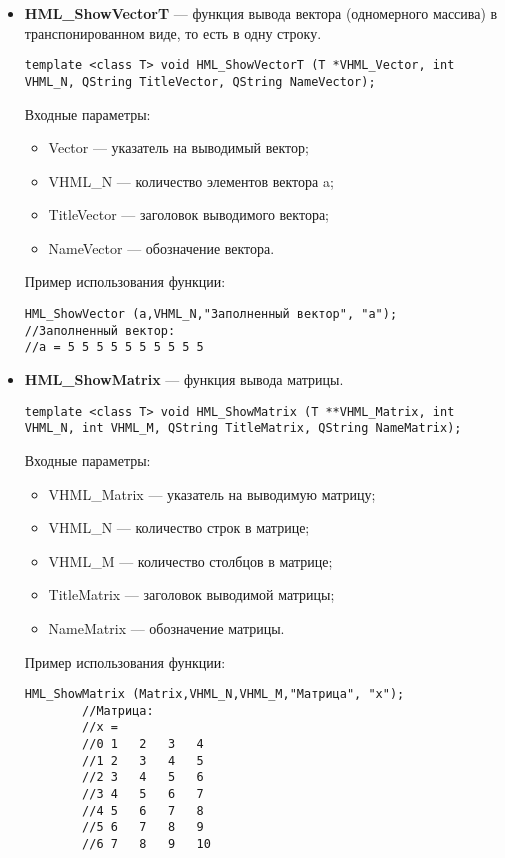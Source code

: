 \begin{itemize}
\begin{lstlisting}[label=examplefunction15_2, caption=Пример использования HML\_ShowVector]
\end{lstlisting}

\item \textbf{HML\_ShowVectorT} --- функция вывода вектора (одномерного массива) в транспонированном виде, то есть в одну строку. 
\begin{lstlisting}[label=examplefunction14_2, caption=Синтаксис функции HML\_ShowVectorT]
template <class T> void HML_ShowVectorT (T *VHML_Vector, int VHML_N, QString TitleVector, QString NameVector);
\end{lstlisting}
Входные параметры: 
\begin{itemize}   
     \item Vector --- указатель на выводимый вектор;
     \item VHML\_N --- количество элементов вектора a;
     \item TitleVector --- заголовок выводимого вектора;
     \item NameVector --- обозначение вектора.
\end{itemize}
Пример использования функции:
\begin{lstlisting}[label=examplefunction15, caption=Пример использования HML\_ShowVectorT]
HML_ShowVector (a,VHML_N,"Заполненный вектор", "a");
//Заполненный вектор:
//a = 5 5 5 5 5 5 5 5 5 5
\end{lstlisting}

\item \textbf{HML\_ShowMatrix} --- функция вывода матрицы. 
\begin{lstlisting}[label=examplefunction16, caption=Синтаксис функции HML\_ShowMatrix]
template <class T> void HML_ShowMatrix (T **VHML_Matrix, int VHML_N, int VHML_M, QString TitleMatrix, QString NameMatrix);
\end{lstlisting}
Входные параметры: 
\begin{itemize}   
     \item VHML\_Matrix --- указатель на выводимую матрицу;
     \item VHML\_N --- количество строк в матрице;
     \item VHML\_M --- количество столбцов в матрице;
     \item TitleMatrix --- заголовок выводимой матрицы;
     \item NameMatrix --- обозначение матрицы.
\end{itemize}
Пример использования функции:
\begin{lstlisting}[label=examplefunction17_2, caption=Пример использования HML\_ShowMatrix]
        HML_ShowMatrix (Matrix,VHML_N,VHML_M,"Матрица", "x");
        //Матрица:
        //x =            
        //0	1	2	3	4
        //1	2	3	4	5
        //2	3	4	5	6
        //3	4	5	6	7
        //4	5	6	7	8
        //5	6	7	8	9
        //6	7	8	9	10  
\end{lstlisting}


\end{itemize}
